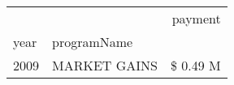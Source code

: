 \begin{tabular}{llr}
\toprule
 &  & payment \\
year & programName &  \\
\midrule
2009 & MARKET GAINS & \$ 0.49 M \\
\cline{1-3}
\bottomrule
\end{tabular}
